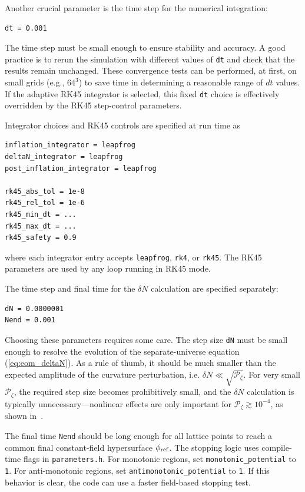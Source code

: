 \documentclass[aps, nofootinbib,superscriptaddress, preprintnumbers, longbibliography]{article}
\begin{document}
Another crucial parameter is the time step for the numerical integration:

\begin{lstlisting}[language=bash,numbers=none]
dt = 0.001
\end{lstlisting}

The time step must be small enough to ensure stability and accuracy. A good practice is to rerun the simulation with different values of \texttt{dt} and check that the results remain unchanged. These convergence tests can be performed, at first, on small grids (e.g., $64^3$) to save time in determining a reasonable range of $dt$ values. If the adaptive RK45 integrator is selected, this fixed \texttt{dt} choice is effectively overridden by the RK45 step-control parameters.

Integrator choices and RK45 controls are specified at run time as
\begin{lstlisting}[language=bash,numbers=none]
inflation_integrator = leapfrog
deltaN_integrator = leapfrog
post_inflation_integrator = leapfrog

rk45_abs_tol = 1e-8
rk45_rel_tol = 1e-6
rk45_min_dt = ...
rk45_max_dt = ...
rk45_safety = 0.9
\end{lstlisting}
where each integrator entry accepts \texttt{leapfrog}, \texttt{rk4}, or \texttt{rk45}. The RK45 parameters are used by any loop running in RK45 mode.

The time step and final time for the $\delta N$ calculation are specified separately:
\begin{lstlisting}[language=bash,numbers=none]
dN = 0.0000001
Nend = 0.001
\end{lstlisting}
Choosing these parameters requires some care. The step size \texttt{dN} must be small enough to resolve the evolution of the separate-universe equation (\cref{eq:eom_deltaN}). As a rule of thumb, it should be much smaller than the expected amplitude of the curvature perturbation, i.e. $\delta N \ll \sqrt{\mathcal{P}_{\zeta}}$. For very small $\mathcal{P}_{\zeta}$, the required step size becomes prohibitively small, and the $\delta N$ calculation is typically unnecessary—nonlinear effects are only important for $\mathcal{P}_{\zeta} \gtrsim 10^{-4}$, as shown in~\cite{Caravano:2025diq}.

The final time \texttt{Nend} should be long enough for all lattice points to reach a common final constant-field hypersurface $\phi_{\rm ref}$.
The stopping logic uses compile-time flags in \texttt{parameters.h}.
For monotonic regions, set \texttt{monotonic\_potential} to \texttt{1}.
For anti-monotonic regions, set \texttt{antimonotonic\_potential} to \texttt{1}.
If this behavior is clear, the code can use a faster field-based stopping test.
\end{document}
